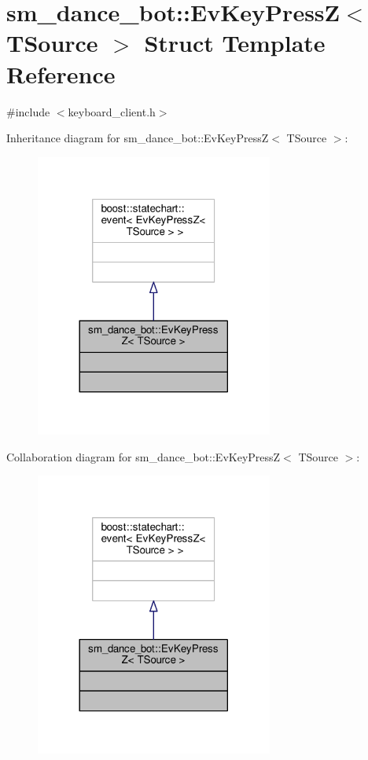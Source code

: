 \hypertarget{structsm__dance__bot_1_1EvKeyPressZ}{}\section{sm\+\_\+dance\+\_\+bot\+:\+:Ev\+Key\+PressZ$<$ T\+Source $>$ Struct Template Reference}
\label{structsm__dance__bot_1_1EvKeyPressZ}


{\ttfamily \#include $<$keyboard\+\_\+client.\+h$>$}



Inheritance diagram for sm\+\_\+dance\+\_\+bot\+:\+:Ev\+Key\+PressZ$<$ T\+Source $>$\+:
\nopagebreak
\begin{figure}[H]
\begin{center}
\leavevmode
\includegraphics[width=221pt]{structsm__dance__bot_1_1EvKeyPressZ__inherit__graph}
\end{center}
\end{figure}


Collaboration diagram for sm\+\_\+dance\+\_\+bot\+:\+:Ev\+Key\+PressZ$<$ T\+Source $>$\+:
\nopagebreak
\begin{figure}[H]
\begin{center}
\leavevmode
\includegraphics[width=221pt]{structsm__dance__bot_1_1EvKeyPressZ__coll__graph}
\end{center}
\end{figure}


